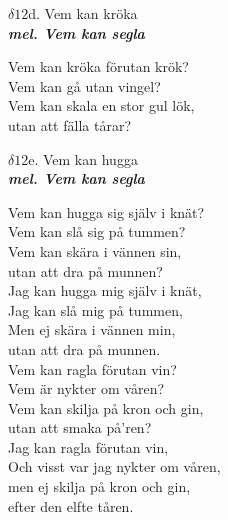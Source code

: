 \documentclass[a6paper,10pt]{article}
\newcommand{\mel}[1]{\small\textbf{\textit{mel. #1 \\}}}
\begin{document}
\newpage
\setlength{\oddsidemargin}{-0.47in}
\noindent
\begin{center}
\Large $\delta12$d. Vem kan kröka\\ 
\mel{Vem kan segla}
\end{center}
Vem kan kröka förutan krök? \\
Vem kan gå utan vingel? \\
Vem kan skala en stor gul lök, \\
utan att fälla tårar? 
\vspace{40pt}
\begin{center}
\Large $\delta12$e. Vem kan hugga\\ 
\mel{Vem kan segla}
\end{center}
Vem kan hugga sig själv i knät? \\
Vem kan slå sig på tummen? \\
Vem kan skära i vännen sin, \\
utan att dra på munnen? 
\vspace{5pt}\\
Jag kan hugga mig själv i knät,\\
Jag kan slå mig på tummen, \\
Men ej skära i vännen min, \\
utan att dra på munnen. 
\vspace{5pt}\\
Vem kan ragla förutan vin? \\
Vem är nykter om våren? \\
Vem kan skilja på kron och gin, \\
utan att smaka på'ren? 
\vspace{5pt}\\
Jag kan ragla förutan vin, \\
Och visst var jag nykter om våren, \\
men ej skilja på kron och gin, \\
efter den elfte tåren.
\end{document}
